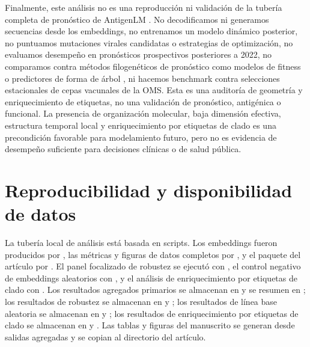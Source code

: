 \documentclass[11pt]{article}
\begin{document}
Finalmente, este análisis no es una reproducción ni validación de la tubería completa de pronóstico de AntigenLM \cite{pei2026antigenlm}. No decodificamos ni generamos secuencias desde los embeddings, no entrenamos un modelo dinámico posterior, no puntuamos mutaciones virales candidatas o estrategias de optimización, no evaluamos desempeño en pronósticos prospectivos posteriores a 2022, no comparamos contra métodos filogenéticos de pronóstico como modelos de fitness o predictores de forma de árbol \cite{luksza2014fitness,neher2014predicting}, ni hacemos benchmark contra selecciones estacionales de cepas vacunales de la OMS. Esta es una auditoría de geometría y enriquecimiento de etiquetas, no una validación de pronóstico, antigénica o funcional. La presencia de organización molecular, baja dimensión efectiva, estructura temporal local y enriquecimiento por etiquetas de clado es una precondición favorable para modelamiento futuro, pero no es evidencia de desempeño suficiente para decisiones clínicas o de salud pública.

\section{Reproducibilidad y disponibilidad de datos}

La tubería local de análisis está basada en scripts. Los embeddings fueron producidos por , las métricas y figuras de datos completos por , y el paquete del artículo por . El panel focalizado de robustez se ejecutó con , el control negativo de embeddings aleatorios con , y el análisis de enriquecimiento por etiquetas de clado con . Los resultados agregados primarios se almacenan en  y se resumen en ; los resultados de robustez se almacenan en  y ; los resultados de línea base aleatoria se almacenan en  y ; los resultados de enriquecimiento por etiquetas de clado se almacenan en  y . Las tablas y figuras del manuscrito se generan desde salidas agregadas y se copian al directorio del artículo.
\end{document}
